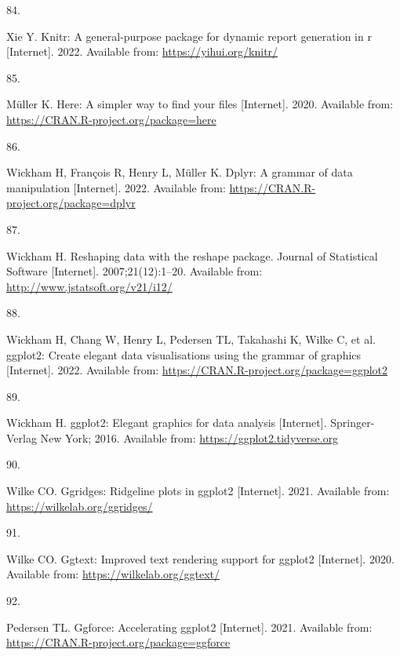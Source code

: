 \documentclass[10pt,a4paper]{article}
\newlength{\cslhangindent}
\newlength{\csllabelwidth}
\newlength{\cslentryspacingunit} %
\newenvironment{CSLReferences}[2] %
 {%
  \setlength{\parindent}{0pt}
  \ifodd #1
  \let\oldpar\par
  \def\par{\hangindent=\cslhangindent\oldpar}
  \fi
  \setlength{\parskip}{#2\cslentryspacingunit}
 }%
 {}
\newcommand{\CSLLeftMargin}[1]{\parbox[t]{\csllabelwidth}{#1}}
\newcommand{\CSLRightInline}[1]{\parbox[t]{\linewidth - \csllabelwidth}{#1}\break}
\begin{document}
\begin{CSLReferences}{0}{0}
\leavevmode{}%
\CSLLeftMargin{84. }
\CSLRightInline{Xie Y. Knitr: A general-purpose package for dynamic report generation in r {[}Internet{]}. 2022. Available from: \url{https://yihui.org/knitr/}}

\leavevmode{}%
\CSLLeftMargin{85. }
\CSLRightInline{Müller K. Here: A simpler way to find your files {[}Internet{]}. 2020. Available from: \url{https://CRAN.R-project.org/package=here}}

\leavevmode{}%
\CSLLeftMargin{86. }
\CSLRightInline{Wickham H, François R, Henry L, Müller K. Dplyr: A grammar of data manipulation {[}Internet{]}. 2022. Available from: \url{https://CRAN.R-project.org/package=dplyr}}

\leavevmode{}%
\CSLLeftMargin{87. }
\CSLRightInline{Wickham H. Reshaping data with the {reshape} package. Journal of Statistical Software {[}Internet{]}. 2007;21(12):1--20. Available from: \url{http://www.jstatsoft.org/v21/i12/}}

\leavevmode{}%
\CSLLeftMargin{88. }
\CSLRightInline{Wickham H, Chang W, Henry L, Pedersen TL, Takahashi K, Wilke C, et al. ggplot2: Create elegant data visualisations using the grammar of graphics {[}Internet{]}. 2022. Available from: \url{https://CRAN.R-project.org/package=ggplot2}}

\leavevmode{}%
\CSLLeftMargin{89. }
\CSLRightInline{Wickham H. ggplot2: Elegant graphics for data analysis {[}Internet{]}. Springer-Verlag New York; 2016. Available from: \url{https://ggplot2.tidyverse.org}}

\leavevmode{}%
\CSLLeftMargin{90. }
\CSLRightInline{Wilke CO. Ggridges: Ridgeline plots in ggplot2 {[}Internet{]}. 2021. Available from: \url{https://wilkelab.org/ggridges/}}

\leavevmode{}%
\CSLLeftMargin{91. }
\CSLRightInline{Wilke CO. Ggtext: Improved text rendering support for ggplot2 {[}Internet{]}. 2020. Available from: \url{https://wilkelab.org/ggtext/}}

\leavevmode{}%
\CSLLeftMargin{92. }
\CSLRightInline{Pedersen TL. Ggforce: Accelerating ggplot2 {[}Internet{]}. 2021. Available from: \url{https://CRAN.R-project.org/package=ggforce}}


\end{CSLReferences}
\end{document}
